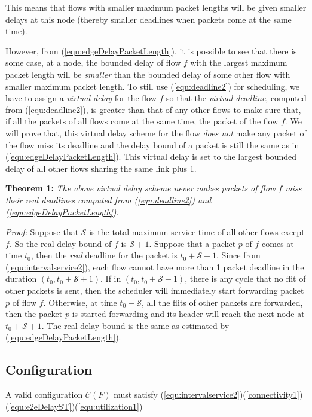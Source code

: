 \documentclass[conference, twocolumn]{IEEEtran}
\theoremstyle{definition}
\begin{document}
This means that flows with smaller maximum packet lengths will be given smaller
delays at this node (thereby smaller deadlines when packets come at the same
time).

However, from (\ref{equ:edgeDelayPacketLength}), it is possible to see that
there is some case, at a node, the bounded delay of flow $f$ with the largest
maximum packet length will be {\em smaller} than the bounded delay of some other
flow with smaller maximum packet length. To still use (\ref{equ:deadline2}) for scheduling, we
have to assign a {\em virtual delay} for the flow $f$ so that the {\em virtual deadline},
computed from (\ref{equ:deadline2}), is greater than that of any other flows to
make sure that, if all the packets of all flows come at the same time, the
packet of the flow $f$. We will prove that, this virtual delay scheme for the
flow {\em does not} make any packet of the flow miss its deadline and the delay
bound of a packet is still the same as in (\ref{equ:edgeDelayPacketLength}).
This virtual delay is set to the largest bounded delay of all other flows
sharing the same link plus 1.

{\textbf{Theorem 1:}} {\em  The above virtual delay scheme never makes
packets of flow $f$ miss their real deadlines computed from
(\ref{equ:deadline2}) and (\ref{equ:edgeDelayPacketLength})}.

{\em Proof:} Suppose that $\mathcal{S}$ is the total maximum service time of all
other flows except $f$. So the real delay bound of $f$ is ${\mathcal S}+1$.
Suppose that a packet $p$ of $f$ comes at time $t_0$, then the {\em real}
deadline for the packet is $t_0+{\mathcal S}+1$. Since from
(\ref{equ:intervalservice2}), each flow cannot have more than 1
packet deadline in the duration $(t_0, t_0+{\mathcal S}+1)$. If in
$(t_0, t_0+{\mathcal S}-1)$, there is any cycle that no flit of other packets is
sent, then the scheduler will immediately start forwarding packet $p$ of flow $f$.
Otherwise, at time $t_0+{\mathcal S}$, all the flits of other packets are
forwarded, then the packet $p$ is started forwarding and its header will reach
the next node at $t_0+{\mathcal S}+1$. The real delay bound is the same as
estimated by (\ref{equ:edgeDelayPacketLength}).

\subsection{Configuration}
A valid configuration ${\mathcal C}(F)$ must satisfy
(\ref{equ:intervalservice2})(\ref{connectivity1}) (\ref{equ:e2eDelayST})(\ref{equ:utilization1})
\end{document}
